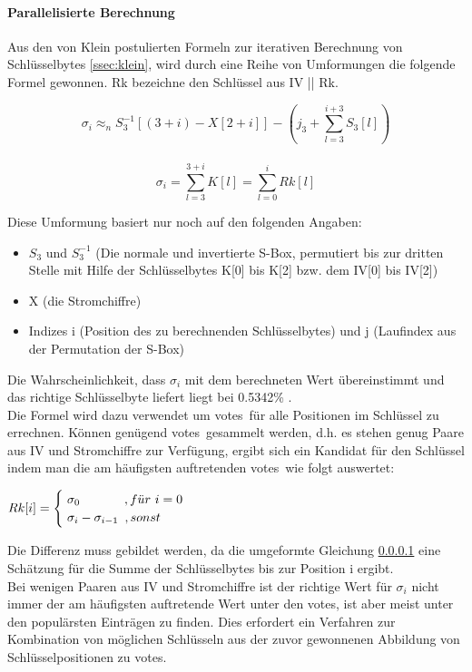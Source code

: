 \documentclass[10pt,a4paper]{article}
\begin{document}
\paragraph{Parallelisierte Berechnung}\label{ssec:p2}
Aus den von Klein postulierten Formeln zur iterativen Berechnung von Schlüsselbytes \ref{ssec:klein}, wird durch eine Reihe von Umformungen \cite[Kapitel 4, Formeln (3)-(5)]{TWP07} die folgende Formel gewonnen. Rk bezeichne den Schlüssel aus IV || Rk.
\begin{center}
\[\sigma_i \approx_n S_3^{-1} [(3 + i) - X[2 + i]] - \left(j_3 + \sum_{l=3}^{i+3} S_3[l]\right)\]
\\\vspace{0.2em}
\[\sigma_i = \sum_{l=3}^{3+i} K[l] = \sum_{l=0}^{i} Rk[l]\]
\end{center}
\vspace{1em}
Diese Umformung basiert nur noch auf den folgenden Angaben:\\
\begin{itemize}
\item $S_3$ und $S_3^{-1}$ (Die normale und invertierte S-Box, permutiert bis zur dritten Stelle mit Hilfe der Schlüsselbytes K[0] bis K[2] bzw. dem IV[0] bis IV[2])
\item X (die Stromchiffre)
\item Indizes i (Position des zu berechnenden Schlüsselbytes) und j (Laufindex aus der Permutation der S-Box)
\end{itemize}
\vspace{0.5em}
Die Wahrscheinlichkeit, dass $\sigma_i$ mit dem berechneten Wert übereinstimmt und das richtige Schlüsselbyte liefert liegt bei 0.5342\% \cite[Kapitel 4, Formel (6)]{TWP07}.\\
Die Formel wird dazu verwendet um \glqq votes\grqq\ für alle Positionen im Schlüssel zu errechnen. Können genügend \glqq votes\grqq\ gesammelt werden, d.h. es stehen genug Paare aus IV und Stromchiffre zur Verfügung, ergibt sich ein Kandidat für den Schlüssel indem man die am häufigsten auftretenden \glqq votes\grqq\ wie folgt auswertet:
\begin{center}
$Rk[i] = \begin{cases}\hspace{0.3em} \sigma_0 \hspace{3.5em}, f\ddot{u}r\ i=0 \\ \hspace{0.3em}\sigma_i - \sigma_{i-1}\hspace{0.5em}, sonst \\\end{cases}$
\end{center}
Die Differenz muss gebildet werden, da die umgeformte Gleichung \ref{ssec:p2} eine Schätzung für die Summe der Schlüsselbytes bis zur Position i ergibt.\\
Bei wenigen Paaren aus IV und Stromchiffre ist der richtige Wert für $\sigma_i$ nicht immer der am häufigsten auftretende Wert unter den \glqq votes\grqq , ist aber meist unter den populärsten Einträgen zu finden. Dies erfordert ein Verfahren zur Kombination von möglichen Schlüsseln aus der zuvor gewonnenen Abbildung von Schlüsselpositionen zu \glqq votes\grqq .
\end{document}
